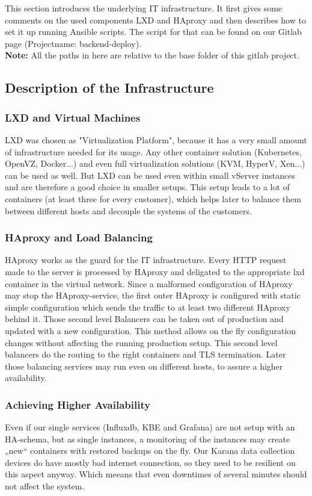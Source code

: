 This section introduces the underlying IT infrastructure. It first gives some comments on the used components LXD and HAproxy and then describes how to set it up running Ansible scripts. The script for that can be found on our Gitlab page (Projectname: backend-deploy).\\
\textbf{Note:} All the paths in here are relative to the base folder of this gitlab project.

\subsection{Description of the Infrastructure}

\subsubsection{LXD and Virtual Machines}

LXD was chosen as "Virtualization Platform", because it has a very small amount of infrastructure needed for its usage. Any other container solution (Kubernetes, OpenVZ, Docker...) and even full virtualization solutions (KVM, HyperV, Xen...) can be used as well.
But LXD can be used even within small vServer instances and are therefore a good choice in smaller setups. This setup leads to a lot of containers (at least three for every customer), which helps later to balance them between different hosts and decouple the systems of the customers.


\subsubsection{HAproxy and Load Balancing}\label{subsubsection:haproxys}
HAproxy works as the guard for the IT infrastructure. Every HTTP request made to the server is processed by HAproxy and deligated to the appropriate lxd container in the virtual network.
Since a malformed configuration of HAproxy may stop the HAproxy-service, the first outer HAproxy is configured with static simple configuration which sends the traffic to at least two different HAproxy behind it. Those second level Balancers can be taken out of production and updated with a new configuration. This method allows on the fly configuration changes without affecting the running production setup.
This second level balancers do the routing to the right containers and TLS termination.
Later those balancing services may run even on different hosts, to assure a higher availability.

\subsubsection{Achieving Higher Availability}
Even if our single services (Influxdb, KBE and Grafana) are not setup with an HA-schema, but as single instances, a monitoring of the instances may create „new“ containers with restored backups on the fly. Our Karana data collection devices do have mostly bad internet connection, so they need to be resilient on this aspect anyway. Which meeans that even downtimes of several minutes should not affect the system.

